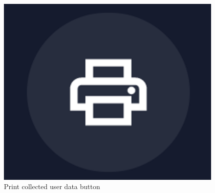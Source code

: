 \documentclass[12pt, a4paper]{article}
\begin{document}
\begin{itemize}
    \begin{figure}[H]
        \centering
        \includegraphics[scale=0.20]{images/icon-print.png}
        \caption{Print collected user data button}
        \label{fig:print}
    \end{figure}

\end{itemize}



\end{document}
